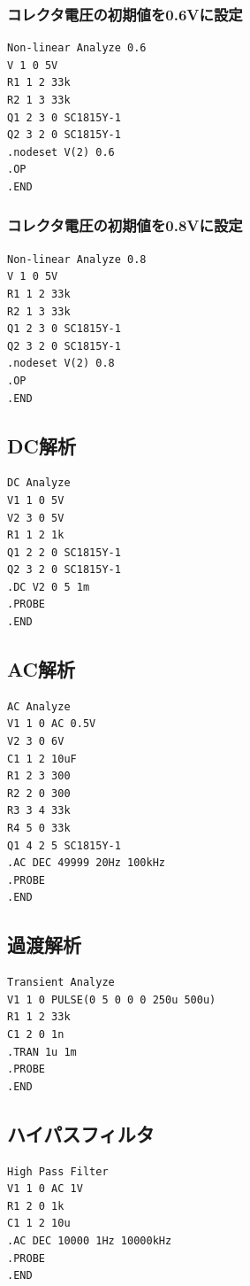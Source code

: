 \documentclass{jlreq}
\numberwithin{equation}{section}
\begin{document}
\subsubsection{コレクタ電圧の初期値を0.6Vに設定}
\begin{verbatim}
Non-linear Analyze 0.6
V 1 0 5V
R1 1 2 33k
R2 1 3 33k
Q1 2 3 0 SC1815Y-1
Q2 3 2 0 SC1815Y-1
.nodeset V(2) 0.6
.OP
.END
\end{verbatim}

\subsubsection{コレクタ電圧の初期値を0.8Vに設定}
\begin{verbatim}
Non-linear Analyze 0.8
V 1 0 5V
R1 1 2 33k
R2 1 3 33k
Q1 2 3 0 SC1815Y-1
Q2 3 2 0 SC1815Y-1
.nodeset V(2) 0.8
.OP
.END
\end{verbatim}

\subsection{DC解析}
\begin{verbatim}
DC Analyze
V1 1 0 5V
V2 3 0 5V
R1 1 2 1k
Q1 2 2 0 SC1815Y-1
Q2 3 2 0 SC1815Y-1
.DC V2 0 5 1m
.PROBE
.END
\end{verbatim}

\subsection{AC解析}
\begin{verbatim}
AC Analyze
V1 1 0 AC 0.5V
V2 3 0 6V
C1 1 2 10uF
R1 2 3 300
R2 2 0 300
R3 3 4 33k
R4 5 0 33k
Q1 4 2 5 SC1815Y-1
.AC DEC 49999 20Hz 100kHz
.PROBE
.END
\end{verbatim}

\subsection{過渡解析}
\begin{verbatim}
Transient Analyze
V1 1 0 PULSE(0 5 0 0 0 250u 500u)
R1 1 2 33k
C1 2 0 1n
.TRAN 1u 1m
.PROBE
.END
\end{verbatim}

\subsection{ハイパスフィルタ}
\begin{verbatim}
High Pass Filter
V1 1 0 AC 1V
R1 2 0 1k
C1 1 2 10u
.AC DEC 10000 1Hz 10000kHz
.PROBE
.END
\end{verbatim}
\end{document}
